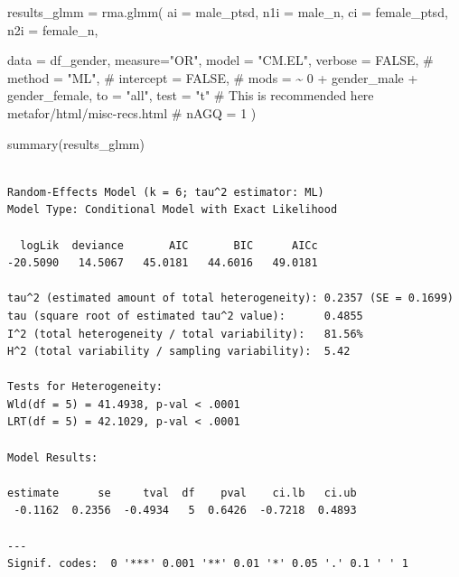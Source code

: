 \documentclass[
  letterpaper,
  DIV=11,
  numbers=noendperiod]{scrartcl}
\newenvironment{Shaded}{\begin{snugshade}}{\end{snugshade}}
\newcommand{\AttributeTok}[1]{\textcolor[rgb]{0.40,0.45,0.13}{#1}}
\newcommand{\CommentTok}[1]{\textcolor[rgb]{0.37,0.37,0.37}{#1}}
\newcommand{\ConstantTok}[1]{\textcolor[rgb]{0.56,0.35,0.01}{#1}}
\newcommand{\FunctionTok}[1]{\textcolor[rgb]{0.28,0.35,0.67}{#1}}
\newcommand{\NormalTok}[1]{\textcolor[rgb]{0.00,0.23,0.31}{#1}}
\newcommand{\OtherTok}[1]{\textcolor[rgb]{0.00,0.23,0.31}{#1}}
\newcommand{\StringTok}[1]{\textcolor[rgb]{0.13,0.47,0.30}{#1}}
\begin{document}
\begin{Shaded}
\begin{Highlighting}[]
\NormalTok{results\_glmm }\OtherTok{=} \FunctionTok{rma.glmm}\NormalTok{(}
  \AttributeTok{ai =} \StringTok{\textasciigrave{}}\AttributeTok{male\_ptsd}\StringTok{\textasciigrave{}}\NormalTok{, }
  \AttributeTok{n1i =} \StringTok{\textasciigrave{}}\AttributeTok{male\_n}\StringTok{\textasciigrave{}}\NormalTok{,}
  \AttributeTok{ci =} \StringTok{\textasciigrave{}}\AttributeTok{female\_ptsd}\StringTok{\textasciigrave{}}\NormalTok{,}
  \AttributeTok{n2i =} \StringTok{\textasciigrave{}}\AttributeTok{female\_n}\StringTok{\textasciigrave{}}\NormalTok{,}
  
  \AttributeTok{data =}\NormalTok{ df\_gender, }
  \AttributeTok{measure=}\StringTok{"OR"}\NormalTok{,}
  \AttributeTok{model =} \StringTok{"CM.EL"}\NormalTok{,}
  \AttributeTok{verbose =} \ConstantTok{FALSE}\NormalTok{,}
  \CommentTok{\# method = "ML",}
  \CommentTok{\# intercept = FALSE,}
  \CommentTok{\# mods = \textasciitilde{} 0 + gender\_male + gender\_female,}
  \AttributeTok{to =} \StringTok{"all"}\NormalTok{,}
  \AttributeTok{test =} \StringTok{"t"} \CommentTok{\# This is recommended here metafor/html/misc{-}recs.html}
  \CommentTok{\# nAGQ = 1}
\NormalTok{)}


\FunctionTok{summary}\NormalTok{(results\_glmm)}
\end{Highlighting}
\end{Shaded}

\begin{verbatim}

Random-Effects Model (k = 6; tau^2 estimator: ML)
Model Type: Conditional Model with Exact Likelihood

  logLik  deviance       AIC       BIC      AICc   
-20.5090   14.5067   45.0181   44.6016   49.0181   

tau^2 (estimated amount of total heterogeneity): 0.2357 (SE = 0.1699)
tau (square root of estimated tau^2 value):      0.4855
I^2 (total heterogeneity / total variability):   81.56%
H^2 (total variability / sampling variability):  5.42

Tests for Heterogeneity:
Wld(df = 5) = 41.4938, p-val < .0001
LRT(df = 5) = 42.1029, p-val < .0001

Model Results:

estimate      se     tval  df    pval    ci.lb   ci.ub    
 -0.1162  0.2356  -0.4934   5  0.6426  -0.7218  0.4893    

---
Signif. codes:  0 '***' 0.001 '**' 0.01 '*' 0.05 '.' 0.1 ' ' 1
\end{verbatim}
\end{document}
